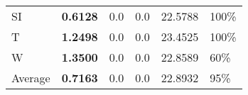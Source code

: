 \documentclass[11pt, a4paper]{article}
\begin{document}
\begin{table}[H]
\begin{tabular}{llllll}
SI                        & \textbf{0.6128}                   & 0.0                               & 0.0                                  & 22.5788                            & 100\%                     \\
T                              & \textbf{1.2498}                   & 0.0                               & 0.0                                  & 23.4525                            & 100\%                     \\
W                             & \textbf{1.3500}                   & 0.0                               & 0.0                                  & 22.8589                            & 60\%                      \\ \hline
Average                               & \textbf{0.7163}                   & 0.0                               & 0.0                                  & 22.8932                            & 95\%
\end{tabular}
\end{table}
\end{document}
